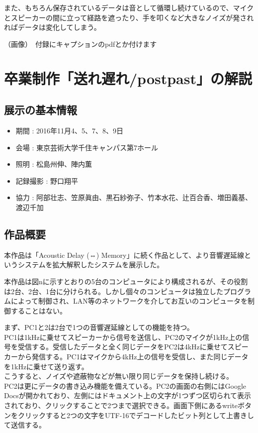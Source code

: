 また、もちろん保存されているデータは音として循環し続けているので、マイクとスピーカーの間に立って経路を遮ったり、手を叩くなど大きなノイズが発されればデータは変化してしまう。

（画像）　付録にキャプションのpdfとか付けます

\section{卒業制作「送れ\textbar{}遅れ/post\textbar{}past」の解説}\label{ux5352ux696dux5236ux4f5cux9001ux308cux9045ux308cpostpastux306eux89e3ux8aac}

\subsection{展示の基本情報}\label{ux5c55ux793aux306eux57faux672cux60c5ux5831-1}

\begin{itemize}
\tightlist
\item
  期間 : 2016年11月4、5、7、8、9日
\item
  会場 : 東京芸術大学千住キャンパス第7ホール
\item
  照明 : 松島州伸、陣内薫
\item
  記録撮影 : 野口翔平
\item
  協力 :
  阿部壮志、笠原眞由、黒石紗弥子、竹本水花、辻百合香、増田義基、渡辺千加
\end{itemize}

\subsection{作品概要}\label{ux4f5cux54c1ux6982ux8981-2}

本作品は「Acoustic Delay (⇔)
Memory」に続く作品として、より音響遅延線というシステムを拡大解釈したシステムを展示した。

本作品は図nに示すとおりの5台のコンピュータにより構成されるが、その役割は2台、2台、1台に分けられる。しかし個々のコンピュータは独立したプログラムによって制御され、LAN等のネットワークを介してお互いのコンピュータを制御することはない。

まず、PC1と2は2台で1つの音響遅延線としての機能を持つ。\\
PC1は1kHzに乗せてスピーカーから信号を送信し、PC2のマイクが1kHz上の信号を受信する。受信したデータと全く同じデータをPC2は4kHzに乗せてスピーカーから発信する。PC1はマイクから4kHz上の信号を受信し、また同じデータを1kHzに乗せて送り返す。\\
こうすると、ノイズや遮蔽物などが無い限り同じデータを保持し続ける。\\
PC2は更にデータの書き込み機能を備えている。PC2の画面の右側にはGoogle
Docsが開かれており、左側にはドキュメント上の文字が1つずつ区切られて表示されており、クリックすることで2つまで選択できる。画面下側にあるwriteボタンをクリックすると2つの文字をUTF-16でデコードしたビット列として上書きして送信する。

